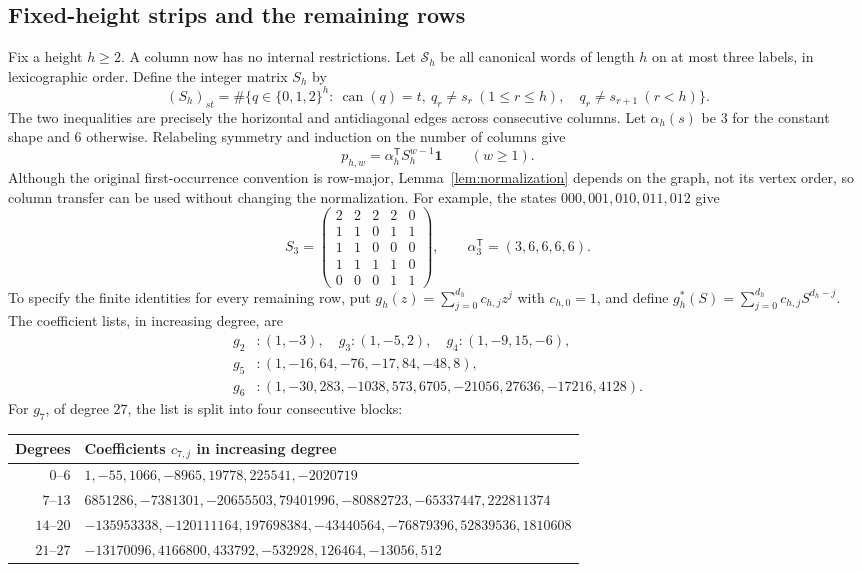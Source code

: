 \documentclass[11pt]{article}
\newcommand{\one}{\mathbf{1}}
\begin{document}
\subsection{Fixed-height strips and the remaining rows}
Fix a height $h\ge2$. A column now has no internal restrictions.
Let $\mathcal S_h$ be all canonical words of length $h$ on at most three
labels, in lexicographic order. Define the integer matrix $S_h$ by
\begin{equation}\label{eq:column-matrix}
(S_h)_{st}=\#\{q\in\{0,1,2\}^h:\ \operatorname{can}(q)=t,
\ q_r\ne s_r\ (1\le r\le h),\quad q_r\ne s_{r+1}\ (r<h)\}.
\end{equation}
The two inequalities are precisely the horizontal and antidiagonal edges
across consecutive columns. Let $\alpha_h(s)$ be $3$ for the constant
shape and $6$ otherwise. Relabeling symmetry and induction on the number
of columns give
\begin{equation}\label{eq:column-count}
p_{h,w}=\alpha_h^{\mathsf T}S_h^{w-1}\one\qquad(w\ge1).
\end{equation}
Although the original first-occurrence convention is row-major,
Lemma~\ref{lem:normalization} depends on the graph, not its vertex order,
so column transfer can be used without changing the normalization.
For example, the states $000,001,010,011,012$ give
\[
S_3=\begin{pmatrix}2&2&2&2&0\\1&1&0&1&1\\1&1&0&0&0\\
1&1&1&1&0\\0&0&0&1&1\end{pmatrix},\qquad
\alpha_3^{\mathsf T}=(3,6,6,6,6).
\]
To specify the finite identities for every remaining row, put
$g_h(z)=\sum_{j=0}^{d_h}c_{h,j}z^j$ with $c_{h,0}=1$, and define
$g_h^*(S)=\sum_{j=0}^{d_h}c_{h,j}S^{d_h-j}$.
The coefficient lists, in increasing degree, are
\begin{align*}
g_2 &: (1,-3),\quad g_3 : (1,-5,2),\quad g_4 : (1,-9,15,-6),\\
g_5 &: (1,-16,64,-76,-17,84,-48,8),\\
g_6 &: (1,-30,283,-1038,573,6705,-21056,27636,-17216,4128).
\end{align*}
For $g_7$, of degree $27$, the list is split into four consecutive blocks:
\begin{center}\small
\begin{tabular}{rl}
\toprule
Degrees & Coefficients $c_{7,j}$ in increasing degree\\\midrule
$0$--$6$ & $1,-55,1066,-8965,19778,225541,-2020719$\\
$7$--$13$ & $6851286,-7381301,-20655503,79401996,-80882723,-65337447,222811374$\\
$14$--$20$ & $-135953338,-120111164,197698384,-43440564,-76879396,52839536,1810608$\\
$21$--$27$ & $-13170096,4166800,433792,-532928,126464,-13056,512$\\
\bottomrule
\end{tabular}
\end{center}
\end{document}
